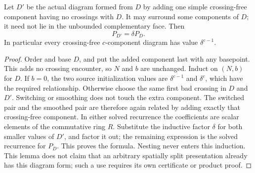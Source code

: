 \begin{lemma}\label{lp:split-circle}\leanok
Let $D'$ be the actual diagram formed from $D$ by adding one simple
crossing-free component having no crossings with $D$. It may surround
some components of $D$; it need not lie in the unbounded complementary
face. Then
\begin{equation}\label{lp:split}
 P_{D'}=\delta P_D.
\end{equation}
In particular every crossing-free $c$-component diagram has value
$\delta^{c-1}$.

\end{lemma}
\begin{proof}\leanok
Order and base $D$, and put the added component last with any basepoint.
This adds no crossing encounter, so $N$ and $b$ are unchanged. Induct on
$(N,b)$ for $D$. If $b=0$, the two source initialization values are
$\delta^{c-1}$ and $\delta^c$, which have the required relationship.
Otherwise choose the same first bad crossing in $D$ and $D'$. Switching
or smoothing does not touch the extra component. The switched pair and
the smoothed pair are therefore again related by adding exactly that
crossing-free component. In either solved recurrence the coefficients
are scalar elements of the commutative ring $R$. Substitute the inductive
factor $\delta$ for both smaller values of $D'$, and factor it out; the
remaining expression is the solved recurrence for $P_D$. This proves
the formula. Nesting never enters this induction. This lemma does not
claim that an arbitrary spatially split presentation already has this
diagram form; such a use requires its own certificate or product proof.
\end{proof}

